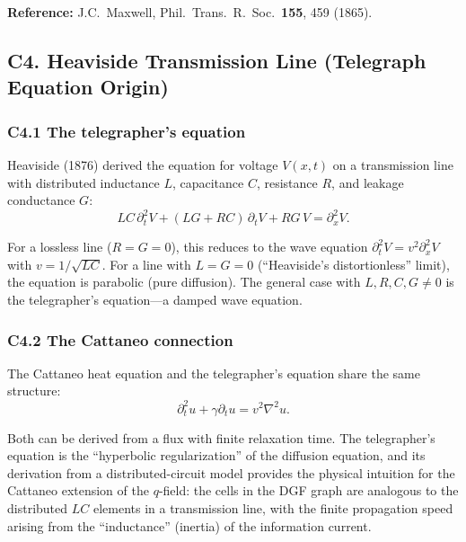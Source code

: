 \documentclass[reprint]{revtex4-2}
\begin{document}
\textbf{Reference:} J.C.\ Maxwell, Phil.\ Trans.\ R.\ Soc.\ \textbf{155}, 459 (1865).

\subsection{C4. Heaviside Transmission Line (Telegraph Equation Origin)}

\subsubsection{C4.1 The telegrapher's equation}

Heaviside (1876) derived the equation for voltage $V(x,t)$ on a transmission line with distributed inductance $L$, capacitance $C$, resistance $R$, and leakage conductance $G$:
\begin{equation}
LC\,\partial_t^2 V + (LG+RC)\,\partial_t V + RG\,V = \partial_x^2 V.
\end{equation}

For a lossless line ($R=G=0$), this reduces to the wave equation $\partial_t^2 V = v^2\partial_x^2 V$ with $v=1/\sqrt{LC}$. For a line with $L=G=0$ (``Heaviside's distortionless'' limit), the equation is parabolic (pure diffusion). The general case with $L,R,C,G \neq 0$ is the telegrapher's equation---a damped wave equation.

\subsubsection{C4.2 The Cattaneo connection}

The Cattaneo heat equation and the telegrapher's equation share the same structure:
\begin{equation}
\partial_t^2 u + \gamma\partial_t u = v^2\nabla^2 u.
\end{equation}

Both can be derived from a flux with finite relaxation time. The telegrapher's equation is the ``hyperbolic regularization'' of the diffusion equation, and its derivation from a distributed-circuit model provides the physical intuition for the Cattaneo extension of the $q$-field: the cells in the DGF graph are analogous to the distributed $LC$ elements in a transmission line, with the finite propagation speed arising from the ``inductance'' (inertia) of the information current.
\end{document}
